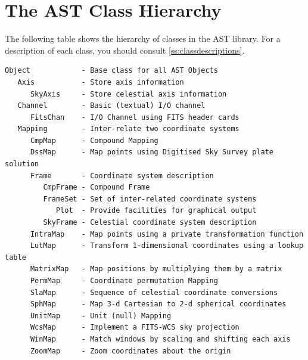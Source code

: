 \documentclass[twoside,11pt]{article}
\newcommand{\appref}[1]{Appendix~\ref{#1}}
\renewcommand{\appref}[1]{\ref{#1}}
\begin{document}

\cleardoublepage
\section{\label{ss:classhierarchy}The AST Class Hierarchy}
The following table shows the hierarchy of classes in the AST library.
For a description of each class, you should consult
\appref{ss:classdescriptions}.

\small
\begin{verbatim}
Object            - Base class for all AST Objects
   Axis           - Store axis information
      SkyAxis     - Store celestial axis information
   Channel        - Basic (textual) I/O channel
      FitsChan    - I/O Channel using FITS header cards
   Mapping        - Inter-relate two coordinate systems
      CmpMap      - Compound Mapping
      DssMap      - Map points using Digitised Sky Survey plate solution
      Frame       - Coordinate system description
         CmpFrame - Compound Frame
         FrameSet - Set of inter-related coordinate systems
            Plot  - Provide facilities for graphical output
         SkyFrame - Celestial coordinate system description
      IntraMap    - Map points using a private transformation function
      LutMap      - Transform 1-dimensional coordinates using a lookup table
      MatrixMap   - Map positions by multiplying them by a matrix
      PermMap     - Coordinate permutation Mapping
      SlaMap      - Sequence of celestial coordinate conversions
      SphMap      - Map 3-d Cartesian to 2-d spherical coordinates
      UnitMap     - Unit (null) Mapping
      WcsMap      - Implement a FITS-WCS sky projection
      WinMap      - Match windows by scaling and shifting each axis
      ZoomMap     - Zoom coordinates about the origin
\end{verbatim}
\normalsize

\cleardoublepage
\end{document}
